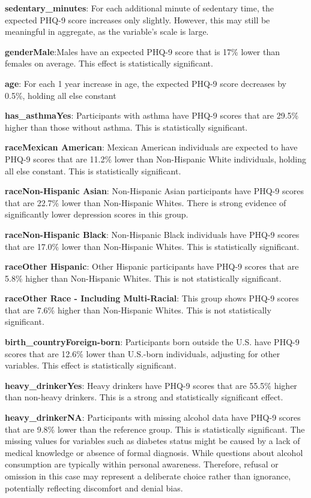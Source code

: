 \documentclass[
  11pt,
]{article}
\begin{document}
\textbf{sedentary\_minutes}: For each additional minute of sedentary time, the expected PHQ-9 score increases only slightly. However, this may still be meaningful in aggregate, as the variable's scale is large.

\textbf{genderMale}:Males have an expected PHQ-9 score that is 17\% lower than females on average. This effect is statistically significant.

\textbf{age}: For each 1 year increase in age, the expected PHQ-9 score decreases by 0.5\%, holding all else constant

\textbf{has\_asthmaYes}: Participants with asthma have PHQ-9 scores that are 29.5\% higher than those without asthma. This is statistically significant.

\textbf{raceMexican American}: Mexican American individuals are expected to have PHQ-9 scores that are 11.2\% lower than Non-Hispanic White individuals, holding all else constant. This is statistically significant.

\textbf{raceNon-Hispanic Asian}: Non-Hispanic Asian participants have PHQ-9 scores that are 22.7\% lower than Non-Hispanic Whites. There is strong evidence of significantly lower depression scores in this group.

\textbf{raceNon-Hispanic Black}: Non-Hispanic Black individuals have PHQ-9 scores that are 17.0\% lower than Non-Hispanic Whites. This is statistically significant.

\textbf{raceOther Hispanic}: Other Hispanic participants have PHQ-9 scores that are 5.8\% higher than Non-Hispanic Whites. This is not statistically significant.

\textbf{raceOther Race - Including Multi-Racial}: This group shows PHQ-9 scores that are 7.6\% higher than Non-Hispanic Whites. This is not statistically significant.

\textbf{birth\_countryForeign-born}: Participants born outside the U.S. have PHQ-9 scores that are 12.6\% lower than U.S.-born individuals, adjusting for other variables. This effect is statistically significant.

\textbf{heavy\_drinkerYes}: Heavy drinkers have PHQ-9 scores that are 55.5\% higher than non-heavy drinkers. This is a strong and statistically significant effect.

\textbf{heavy\_drinkerNA}: Participants with missing alcohol data have PHQ-9 scores that are 9.8\% lower than the reference group. This is statistically significant. The missing values for variables such as diabetes status might be caused by a lack of medical knowledge or absence of formal diagnosis. While questions about alcohol consumption are typically within personal awareness. Therefore, refusal or omission in this case may represent a deliberate choice rather than ignorance, potentially reflecting discomfort and denial bias.
\end{document}
